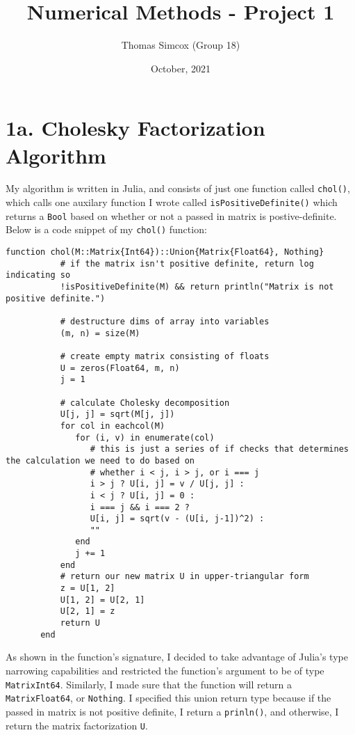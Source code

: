 \documentclass{article}
\title{Numerical Methods - Project 1}
\author{Thomas Simcox (Group 18)}
\date{October, 2021}
\begin{document}
    \maketitle

    \section*{1a. Cholesky Factorization Algorithm}
    \bigbreak
    My algorithm is written in Julia, and consists of just one function called \texttt{chol()}, which calls one auxilary
    function I wrote called \texttt{isPositiveDefinite()} which returns a \texttt{Bool} based on whether or not a passed in matrix 
    is postive-definite. Below is a code snippet of my \texttt{chol()} function:
    \begin{Verbatim}[fontsize=\small,xleftmargin=0cm]
        function chol(M::Matrix{Int64})::Union{Matrix{Float64}, Nothing}
           # if the matrix isn't positive definite, return log indicating so
           !isPositiveDefinite(M) && return println("Matrix is not positive definite.")
          
           # destructure dims of array into variables
           (m, n) = size(M)
           
           # create empty matrix consisting of floats
           U = zeros(Float64, m, n)
           j = 1
          
           # calculate Cholesky decomposition
           U[j, j] = sqrt(M[j, j])
           for col in eachcol(M)
              for (i, v) in enumerate(col)
                 # this is just a series of if checks that determines the calculation we need to do based on
                 # whether i < j, i > j, or i === j
                 i > j ? U[i, j] = v / U[j, j] :
                 i < j ? U[i, j] = 0 :
                 i === j && i === 2 ?
                 U[i, j] = sqrt(v - (U[i, j-1])^2) :
                 ""
              end
              j += 1
           end
           # return our new matrix U in upper-triangular form
           z = U[1, 2]
           U[1, 2] = U[2, 1]
           U[2, 1] = z
           return U
       end
    \end{Verbatim}

    As shown in the function's signature, I decided to take advantage of Julia's type narrowing capabilities and restricted the 
    function's argument to be of type \texttt{Matrix{Int64}}. Similarly, I made sure that the function will return a \texttt{Matrix{Float64}}, or \texttt{Nothing}.
    I specified this union return type because if the passed in matrix is not positive definite, I return a \texttt{prinln()}, and otherwise,
    I return the matrix factorization \texttt{U}.
\end{document}
